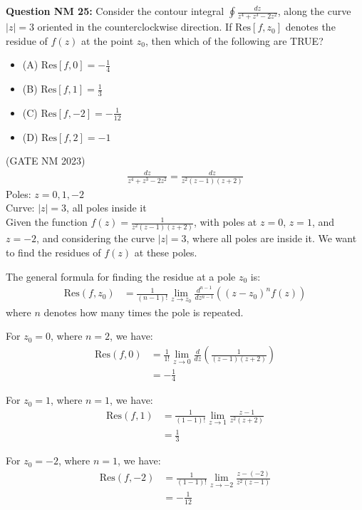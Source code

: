 \documentclass[journal,12pt,twocolumn]{IEEEtran}
\theoremstyle{remark}
\begin{document}
\title{}
\author{Sasa Mardi, EE23BTECH11222}
\date{}
\maketitle

\textbf{Question NM 25:} Consider the contour integral $\oint \frac{dz}{z^4 + z^3 - 2z^2}$, along the curve $|z| = 3$ oriented in the counterclockwise direction. If $\text{Res}[f, z_0]$ denotes the residue of $f(z)$ at the point $z_0$, then which of the following are TRUE? \\
\begin{itemize}
    \item (A) $\text{Res}[f, 0] = -\frac{1}{4}$
    \item (B) $\text{Res}[f, 1] = \frac{1}{3}$
    \item (C) $\text{Res}[f, -2] = -\frac{1}{12}$
    \item (D) $\text{Res}[f, 2] = -1$
\end{itemize}
\hfill{(GATE NM 2023)}\\
\solution
\begin{align}
\frac{dz}{z^4 + z^3 - 2z^2} = \frac{dz}{z^2(z-1)(z+2)}
\end{align}
Poles: $z = 0, 1, -2$ \\
Curve: $|z| = 3$, all poles inside it \\
Given the function $f(z) = \frac{1}{z^2(z-1)(z+2)}$, with poles at $z = 0$, $z = 1$, and $z = -2$, and considering the curve $|z| = 3$, where all poles are inside it. We want to find the residues of $f(z)$ at these poles.

The general formula for finding the residue at a pole $z_0$ is:
\begin{align}
\text{Res}(f, z_0) &= \frac{1}{(n-1)!} \lim_{z \to z_0} \frac{d^{n-1}}{dz^{n-1}} \left( (z - z_0)^n f(z) \right)
\end{align}
where $n$ denotes how many times the pole is repeated.

For $z_0 = 0$, where $n = 2$, we have:
\begin{align}
\text{Res}(f, 0) &= \frac{1}{1!} \lim_{z \to 0} \frac{d}{dz} \left( \frac{1}{(z-1)(z+2)} \right) \\
&= -\frac{1}{4}
\end{align}

For $z_0 = 1$, where $n = 1$, we have:
\begin{align}
\text{Res}(f, 1) &= \frac{1}{(1-1)!} \lim_{z \to 1} \frac{z-1}{z^2(z+2)} \\
&= \frac{1}{3}
\end{align}

For $z_0 = -2$, where $n = 1$, we have:
\begin{align}
\text{Res}(f, -2) &= \frac{1}{(1-1)!} \lim_{z \to -2} \frac{z-(-2)}{z^2(z-1)} \\
&= -\frac{1}{12}
\end{align}\\
\end{document}
